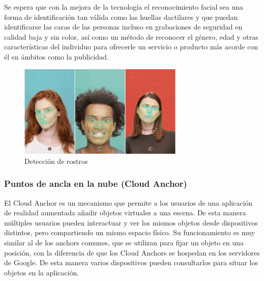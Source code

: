 Se espera que con la mejora de la tecnología el reconocimiento facial sea una forma de identificación tan válida como las huellas dactilares y que puedan identificarse las caras de las personas incluso en grabaciones de seguridad en calidad baja y sin color, así como un método de reconocer el género, edad y otras características del individuo para ofrecerle un servicio o producto más acorde con él en ámbitos como la publicidad.\\
\begin{figure}[H]
     \centering
     \includegraphics[width=0.7\textwidth]{Images/FaceRecognition.png}
     \caption{Detección de rostros}
     \label{fig:FaceRecognition}
 \end{figure}

\subsubsection{Puntos de ancla en la nube (Cloud Anchor)}
El Cloud Anchor es un mecanismo que permite a los usuarios de una aplicación de realidad aumentada añadir objetos virtuales a una escena. De esta manera múltiples usuarios pueden interactuar y ver los mismos objetos desde dispositivos distintos, pero compartiendo un mismo espacio físico. Su funcionamiento es muy similar al de los anchors comunes, que se utilizan para fijar un objeto en una posición, con la diferencia de que los Cloud Anchors se hospedan en los servidores de Google. De esta manera varios dispositivos pueden consultarlos para situar los objetos en la aplicación.\\

